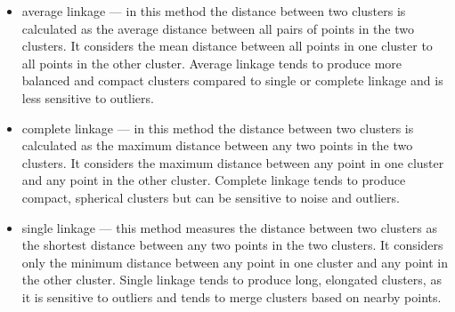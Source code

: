 \documentclass[11pt,a4paper]{article}\usepackage[]{graphicx}\usepackage[]{xcolor}
\begin{document}
\begin{itemize}
\item average linkage --- in this method the distance between two clusters is calculated as the average distance between all pairs of points in the two clusters. It considers the mean distance between all points in one cluster to all points in the other cluster. Average linkage tends to produce more balanced and compact clusters compared to single or complete linkage and is less sensitive to outliers.
 \item complete linkage --- in this method the distance between two clusters is calculated as the maximum distance between any two points in the two clusters. It considers the maximum distance between any point in one cluster and any point in the other cluster. Complete linkage tends to produce compact, spherical clusters but can be sensitive to noise and outliers.
 \item single linkage --- this method measures the distance between two clusters as the shortest distance between any two points in the two clusters. It considers only the minimum distance between any point in one cluster and any point in the other cluster. Single linkage tends to produce long, elongated clusters, as it is sensitive to outliers and tends to merge clusters based on nearby points.
	
	\end{itemize}
	
	

	

	
	

	

	

	




	



	

	

	


	

	

	


	

	

	
	



	
	

	
	



	
	

	
\end{document}
